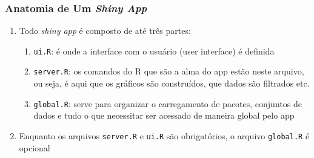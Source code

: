 \documentclass[12pt, compress, usetitleprogressbar]{beamer}\usepackage[]{graphicx}\usepackage[]{color}
\begin{document}
\begin{frame}

\frametitle{Anatomia de Um \emph{Shiny App}}

\begin{enumerate}[label=$\bullet$, leftmargin=*]

  \item Todo \emph{shiny app} é composto de até três partes:

  \begin{enumerate}[label=$\bullet$, leftmargin=*]

    \item \texttt{ui.R}: é onde a interface com o usuário (user interface) é definida

    \item \texttt{server.R}: os comandos do R que são a alma do app estão neste arquivo, ou seja, é aqui que os gráficos são construídos, que dados são filtrados etc.

    \item \texttt{global.R}: serve para organizar o carregamento de pacotes, conjuntos de dados e tudo o que necessitar ser acessado de maneira global pelo app

  \end{enumerate}

  \item Enquanto os arquivos \texttt{server.R} e \texttt{ui.R} são obrigatórios, o arquivo \texttt{global.R} é opcional

\end{enumerate}

\end{frame}

\end{document}
